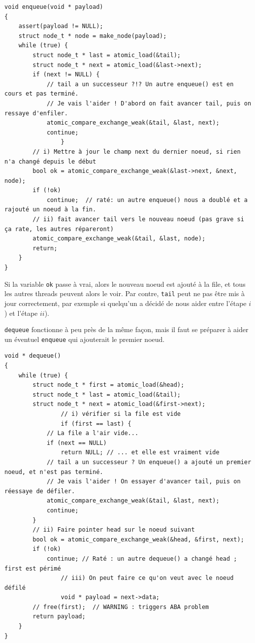 \begin{verbatim}
void enqueue(void * payload)
{
	assert(payload != NULL);
	struct node_t * node = make_node(payload);
	while (true) {
		struct node_t * last = atomic_load(&tail);
		struct node_t * next = atomic_load(&last->next);
		if (next != NULL) {              
			// tail a un successeur ?!? Un autre enqueue() est en cours et pas terminé.
			// Je vais l'aider ! D'abord on fait avancer tail, puis on ressaye d'enfiler.
			atomic_compare_exchange_weak(&tail, &last, next);
			continue;
                }
		// i) Mettre à jour le champ next du dernier noeud, si rien n'a changé depuis le début
		bool ok = atomic_compare_exchange_weak(&last->next, &next, node);
		if (!ok)
			continue;  // raté: un autre enqueue() nous a doublé et a rajouté un noeud à la fin.
		// ii) fait avancer tail vers le nouveau noeud (pas grave si ça rate, les autres répareront)
		atomic_compare_exchange_weak(&tail, &last, node);
		return;
	}
}
\end{verbatim}

Si la variable \texttt{ok} passe à vrai, alors le nouveau noeud est ajouté à la
file, et tous les autres threads peuvent alors le voir. Par contre,
\texttt{tail} peut ne pas être mis à jour correctement, par exemple si quelqu'un
a décidé de nous \og aider\fg{} entre l'étape $i$) et l'étape $ii$).

\texttt{dequeue} fonctionne à peu près de la même façon, mais il faut se
préparer à aider un éventuel \texttt{enqueue} qui ajouterait le premier noeud.

\begin{verbatim}
void * dequeue()
{
	while (true) {
		struct node_t * first = atomic_load(&head); 
		struct node_t * last = atomic_load(&tail);
		struct node_t * next = atomic_load(&first->next); 
                // i) vérifier si la file est vide
                if (first == last) {
			// La file a l'air vide...
			if (next == NULL)
				return NULL; // ... et elle est vraiment vide
			// tail a un successeur ? Un enqueue() a ajouté un premier noeud, et n'est pas terminé.
			// Je vais l'aider ! On essayer d'avancer tail, puis on réessaye de défiler.
			atomic_compare_exchange_weak(&tail, &last, next);
			continue;
		}
		// ii) Faire pointer head sur le noeud suivant
		bool ok = atomic_compare_exchange_weak(&head, &first, next);
		if (!ok)
			continue; // Raté : un autre dequeue() a changé head ; first est périmé  
                // iii) On peut faire ce qu'on veut avec le noeud défilé
                void * payload = next->data;
		// free(first);  // WARNING : triggers ABA problem
		return payload;
	}
}
\end{verbatim}

